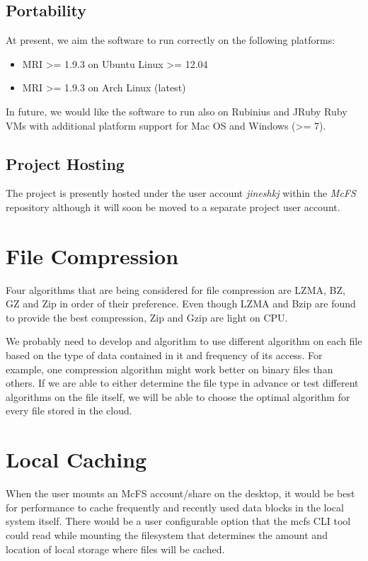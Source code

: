 \subsection{Portability}
At present, we aim the software to run correctly on the following platforms:

\begin{itemize}
	\item MRI >= 1.9.3 on Ubuntu Linux >= 12.04
	\item MRI >= 1.9.3 on Arch Linux (latest)
\end{itemize}

In future, we would like the software to run also on Rubinius and JRuby Ruby VMs with additional platform support for Mac OS and Windows (>= 7).

\subsection{Project Hosting}
The project is presently hosted under the user account \emph{jineshkj} within the \emph{McFS} repository although it will soon be moved to a separate project user account.

\section{File Compression}
Four algorithms that are being considered for file compression are LZMA, BZ, GZ and Zip in order of their preference. Even though LZMA and Bzip are found to provide the best compression, Zip and Gzip are light on CPU.

We probably need to develop and algorithm to use different algorithm on each file based on the type of data contained in it and frequency of its access. For example, one compression algorithm might work better on binary files than others. If we are able to either determine the file type in advance or test different algorithms on the file itself, we will be able to choose the optimal algorithm for every file stored in the cloud.

\section{Local Caching}
When the user mounts an McFS account/share on the desktop, it would be best for performance to cache frequently and recently used data blocks in the local system itself. There would be a user configurable option that the mcfs CLI tool could read while mounting the filesystem that determines the amount and location of local storage where files will be cached.

